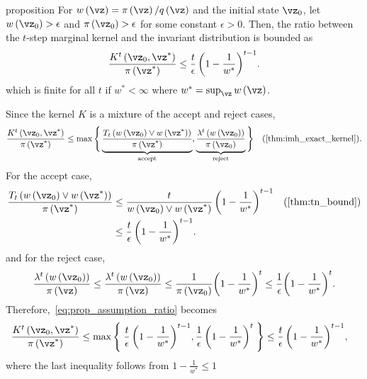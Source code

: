 
\begin{theoremEnd}{proposition}\label{thm:imh_tail}
  For \(w\left(\vz\right) = \pi\left(\vz\right)/q\left(\vz\right)\) and the initial state \(\vz_0\), let \(w\left(\vz_0\right) > \epsilon\) and \(\pi\left(\vz_0\right) > \epsilon\) for some constant \(\epsilon > 0\).
  Then, the ratio between the \(t\)-step marginal kernel and the invariant distribution is bounded as
  {%
  \[
  \frac{K^t\left(\vz_0, \vz^*\right)}{\pi\left(\vz^*\right)} \leq
  \frac{t}{\epsilon} \, {\left(1 - \frac{1}{w^*}\right)}^{t-1}.
  \]
  }
  which is finite for all \(t\) if \(w^* < \infty\) where \(w^* = \sup_{\vz} w\left(\vz\right)\).
\end{theoremEnd}
\begin{proofEnd}
  Since the kernel \(K\) is a mixture of the accept and reject cases, 
  \begin{align}
    \frac{K^t\left(\vz_0, \vz^*\right)}{\pi\left(\vz^*\right)}
    &\leq
    \max\Bigg\{
    \underbrace{
      \frac{T_t\left(w\left(\vz_0\right) \vee w\left(\vz^*\right)\right)}{\pi\left(\vz^*\right)}
    }_{\text{accept}},
    \underbrace{
    \frac{\lambda^t\left(w\left(\vz_0\right)\right)}{\pi\left(\vz_0\right)}
    }_{\text{reject}}
    \Bigg\}
    &\text{(\cref{thm:imh_exact_kernel})}.\label{eq:prop_assumption_ratio}
  \end{align}
  For the accept case,
  \begin{align}
    \frac{T_t\left(w\left(\vz_0\right) \vee w\left(\vz^*\right)\right)}{\pi\left(\vz^*\right)}
    &\leq
    \frac{t}{w\left(\vz_0\right) \vee w\left(\vz^*\right)} \, {\left(1 - \frac{1}{w^*}\right)}^{t-1}
    &\text{(\cref{thm:tn_bound})}
    \\
    &\leq
    \frac{t}{\epsilon} \, {\left(1 - \frac{1}{w^*}\right)}^{t-1} .
  \end{align}
  and for the reject case,
  \begin{align}
    \frac{\lambda^t\left(w\left(\vz_0\right)\right)}{\pi\left(\vz\right)}
    \leq
    \frac{\lambda^t\left(w\left(\vz_0\right)\right)}{\pi\left(\vz\right)}
    \leq
    \frac{1}{\pi\left(\vz_0\right)} {\left(1 - \frac{1}{w^*}\right)}^{t}
    \leq
    \frac{1}{\epsilon}
    {\left(1 - \frac{1}{w^*}\right)}^{t}.
  \end{align}
  Therefore,~\cref{eq:prop_assumption_ratio} becomes
  \begin{align}
    \frac{K^t\left(\vz_0, \vz^*\right)}{\pi\left(\vz^*\right)}
    \leq
    \max\left\{\;
    \frac{t}{\epsilon} \, {\left(1 - \frac{1}{w^*}\right)}^{t-1},
    \frac{1}{\epsilon} \, {\left(1-\frac{1}{w^*}\right)}^t
    \;\right\}
    &\leq
    \frac{t}{\epsilon} \, {\left(1 - \frac{1}{w^*}\right)}^{t-1},
  \end{align}
  where the last inequality follows from \(1 - \frac{1}{w^*} \leq 1\)
\end{proofEnd}

